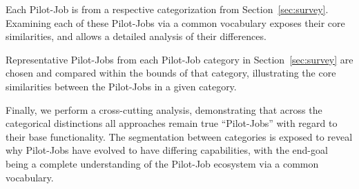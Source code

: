 \documentclass{sig-alternate}
\begin{document}
Each Pilot-Job is from
a respective categorization from Section~\ref{sec:survey}.
Examining each of these Pilot-Jobs via a common vocabulary
exposes their core similarities, and allows a detailed analysis
of their differences. 

Representative Pilot-Jobs from each Pilot-Job category
in Section~\ref{sec:survey} are chosen and compared within
the bounds of that category, illustrating the core similarities
between the Pilot-Jobs in a given category.


Finally, we perform
a cross-cutting analysis, demonstrating that across the categorical
distinctions all approaches remain true ``Pilot-Jobs'' with regard
to their base functionality.  The segmentation between categories
is exposed to reveal why Pilot-Jobs have evolved to have
differing capabilities, with the end-goal being a
complete understanding of the Pilot-Job ecosystem via a common
vocabulary.



\end{document}
